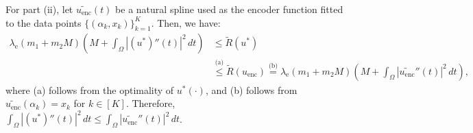 \documentclass{article}
\def\encs{u_\textrm{enc}}
\def\enclamb{\lambda_\textrm{e}}
\newcommand{\norm}[1]{\left\lVert#1\right\rVert}
\newcommand{\lp}[1]{{L}^{#1}\left(\Omega; \mathbb{R}\right)}
\newcommand{\hiltilde}[1]{\widetilde{\mathcal{H}}^{#1}\left(\Omega;\mathbb{R}\right)}
\newcommand{\lec}[2]{\stackrel{\text{#1}}{#2}}
\begin{document}

For part (ii), let $\widetilde{\encs}(t)$ be a natural spline used as the encoder function fitted to the data points $\{(\alpha_k, x_k)\}_{k=1}^K$. Then, we have:
\begin{align}
    \enclamb (m_1 + m_2M)\left(M + \int_\Omega |(u^*)''(t)|^2\,dt\right) &\lec{}{\leqslant} \widetilde{R}(u^*) \nonumber \\ &\lec{(a)}{\leqslant} \widetilde{R}(\encs) \lec{(b)}{=} \enclamb (m_1 + m_2M)\left(M + \int_\Omega |\widetilde{\encs}''(t)|^2\,dt\right),
\end{align}
where (a) follows from the optimality of $u^*(\cdot)$, and (b) follows from $\widetilde{\encs}(\alpha_k) = x_k$ for $k \in [K]$. Therefore, $\int_\Omega |(u^*)''(t)|^2\,dt \leqslant \int_\Omega |\widetilde{\encs}''(t)|^2\,dt$. 
\end{document}
